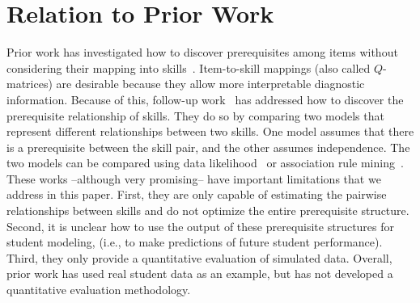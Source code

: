 \documentclass{edm_template}
\begin{document}
\section{Relation to Prior Work}
\label{sec:previous_work}

Prior work has investigated how to discover %
 prerequisites among items without considering their mapping into skills~\cite{desmarais2006learned,vuong2010method}. %
Item-to-skill mappings (also called $Q$-matrices) are desirable because they allow more interpretable diagnostic information.
Because of this, follow-up work~\cite{brunskill2010estimating,chen2015discovering}  has addressed how to discover the prerequisite relationship of skills.
They do so by comparing two models that represent different relationships between two skills.
One model assumes that there is a prerequisite between the skill pair, and the other assumes independence.
The two models can be compared using data likelihood~\cite{brunskill2010estimating} or  association rule mining~\cite{chen2015discovering}.
These works --although very promising--   have important limitations that we address in this paper.
First,  they are only capable of estimating the pairwise relationships between skills and do not optimize the entire prerequisite structure.
Second, it is unclear how to use the output of these prerequisite structures for student modeling, (i.e., to make predictions of future student performance).
Third, they only provide a quantitative evaluation of simulated data.
Overall, prior work has used real student data as an example, but has not developed a quantitative evaluation methodology.
\end{document}
